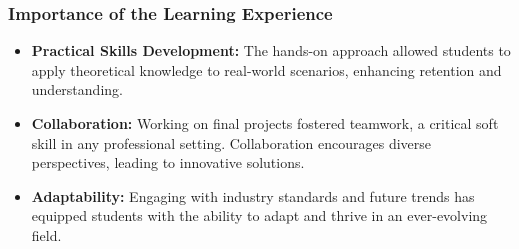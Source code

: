 \documentclass[aspectratio=169]{beamer}
\begin{document}
\begin{frame}[fragile]
    \frametitle{Importance of the Learning Experience}
    
    \begin{itemize}
        \item \textbf{Practical Skills Development:} 
        The hands-on approach allowed students to apply theoretical knowledge to real-world scenarios, enhancing retention and understanding.
        
        \item \textbf{Collaboration:} 
        Working on final projects fostered teamwork, a critical soft skill in any professional setting. Collaboration encourages diverse perspectives, leading to innovative solutions.
        
        \item \textbf{Adaptability:} 
        Engaging with industry standards and future trends has equipped students with the ability to adapt and thrive in an ever-evolving field.
    \end{itemize}
\end{frame}
\end{document}
